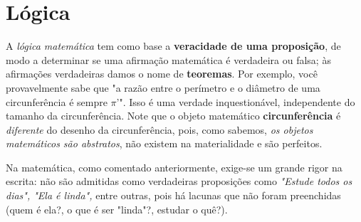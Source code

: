\documentclass[13pt,letterpaper]{article}
\begin{document}
\section{Lógica}

A \emph{lógica matemática} tem como base a \textbf{veracidade de uma proposição}, de modo a determinar se uma afirmação matemática é verdadeira ou falsa; às afirmações verdadeiras damos o nome de \textbf{teoremas}. Por exemplo, você provavelmente sabe que "a razão entre o perímetro e o diâmetro de uma circunferência é sempre $\pi$'". 
Isso é uma verdade inquestionável, independente do tamanho da circunferência. Note que o objeto matemático \textbf{circunferência} é \emph{diferente} do desenho da circunferência, pois, como sabemos, \emph{os objetos matemáticos são abstratos}, não existem na materialidade e são perfeitos.
\par
Na matemática, como comentado anteriormente, exige-se um grande rigor na escrita: não são admitidas como verdadeiras proposições como \emph{"Estude todos os dias", "Ela é linda",} entre outras, pois há lacunas que não foram preenchidas (quem é ela?, o que é ser "linda"?, estudar o quê?).
\end{document}
